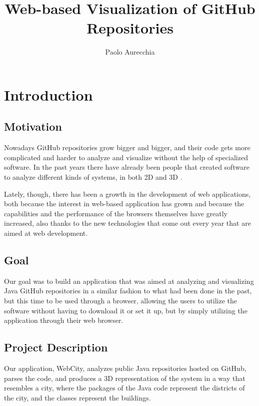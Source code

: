 \documentclass[]{usiinfbachelorproject}
\author{Paolo Aurecchia}
\title{Web-based Visualization of GitHub Repositories}
\subtitle{}
\begin{document}
\maketitle

\section{Introduction} \label{introduction}

\subsection{Motivation} \label{Motivation}
Nowadays GitHub repositories grow bigger and bigger, and their code gets more complicated and harder to analyze and visualize without the help of specialized software. In the past years there have already been people that created software to analyze different kinds of systems, in both 2D and 3D \cite{Wett07b} \cite{Wett2008b} \cite{Wett2008a}.

Lately, though, there has been a growth in the development of web applications, both because the interest in web-based application has grown and because the capabilities and the performance of the browsers themselves have greatly increased, also thanks to the new technologies that come out every year that are aimed at web development.

\subsection{Goal} \label{Goal}
Our goal was to build an application that was aimed at analyzing and visualizing Java GitHub repositories in a similar fashion to what had been done in the past, but this time to be used through a browser, allowing the users to utilize the software without having to download it or set it up, but by simply utilizing the application through their web browser.

\subsection{Project Description} \label{Project Description}
Our application, WebCity, analyzes public Java repositories hosted on GitHub, parses the code, and produces a 3D representation of the system in a way that resembles a city, where the packages of the Java code represent the districts of the city, and the classes represent the buildings.
\end{document}
